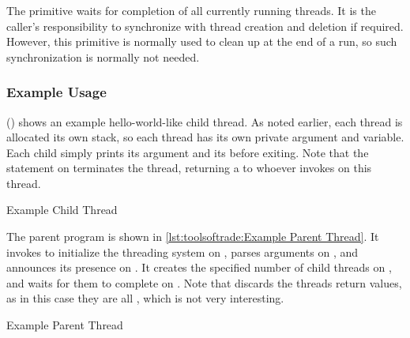 \subsubsection{}

The 
primitive waits for completion of all currently running threads.
It is the caller's responsibility to synchronize with thread creation
and deletion if required.
However, this primitive is normally used to clean up at the end of
a run, so such synchronization is normally not needed.

\subsubsection{Example Usage}

 ()
shows an example hello-world-like child thread.
As noted earlier, each thread is allocated its own stack, so
each thread has its own private  argument and  variable.
Each child simply prints its argument and its 
before exiting.
Note that the  statement on
 terminates the thread,
returning a  to whoever invokes  on this
thread.

\begin{listing}

\caption{Example Child Thread}
\label{lst:toolsoftrade:Example Child Thread}
\end{listing}

\begin{fcvref}
The parent program is shown in
\cref{lst:toolsoftrade:Example Parent Thread}.
It invokes  to initialize the threading system on
,
parses arguments on ,
and announces its presence on .
It creates the specified number of child threads on
,
and waits for them to complete on .
Note that  discards the threads return values,
as in this case they are all , which is not very interesting.
\end{fcvref}

\begin{listing}

\caption{Example Parent Thread}
\label{lst:toolsoftrade:Example Parent Thread}
\end{listing}

